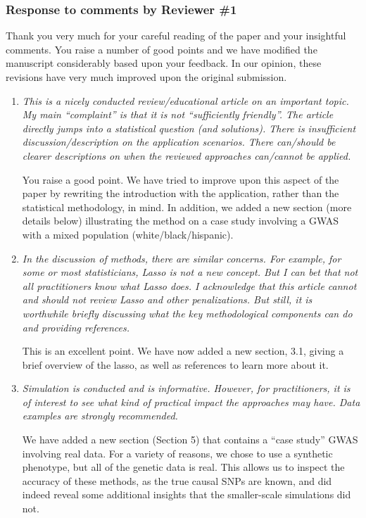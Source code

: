 \documentclass{article}
\begin{document}
\subsubsection*{Response to comments by Reviewer \#1}

Thank you very much for your careful reading of the paper and your insightful comments. You raise a number of good points and we have modified the manuscript considerably based upon your feedback.  In our opinion, these revisions have very much improved upon the original submission.

\begin{enumerate}

\item \emph{This is a nicely conducted review/educational article on an important topic. My main ``complaint'' is that it is not ``sufficiently friendly''.  The article directly jumps into a statistical question (and solutions). There is insufficient discussion/description on the application scenarios. There can/should be clearer descriptions on when the reviewed approaches can/cannot be applied.}

  You raise a good point.  We have tried to improve upon this aspect of the paper by rewriting the introduction with the application, rather than the statistical methodology, in mind.  In addition, we added a new section (more details below) illustrating the method on a case study involving a GWAS with a mixed population (white/black/hispanic).
  
\item \emph{In the discussion of methods, there are similar concerns. For example, for some or most statisticians, Lasso is not a new concept. But I can bet that not all practitioners know what Lasso does. I acknowledge that this article cannot and should not review Lasso and other penalizations. But still, it is worthwhile briefly discussing what the key methodological components can do and providing references.}

  This is an excellent point. We have now added a new section, 3.1, giving a brief overview of the lasso, as well as references to learn more about it.

\item \emph{Simulation is conducted and is informative. However, for practitioners, it is of interest to see what kind of practical impact the approaches may have. Data examples are strongly recommended.}

  We have added a new section (Section 5) that contains a ``case study'' GWAS involving real data.  For a variety of reasons, we chose to use a synthetic phenotype, but all of the genetic data is real.  This allows us to inspect the accuracy of these methods, as the true causal SNPs are known, and did indeed reveal some additional insights that the smaller-scale simulations did not.


\end{enumerate}
\end{document}
